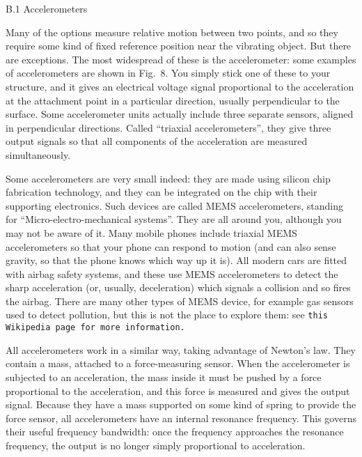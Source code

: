   B.1 Accelerometers 

  Many of the options measure relative motion between two points, and so they 
  require some kind of fixed reference position near the vibrating object. But 
  there are exceptions. The most widespread of these is the accelerometer: some 
  examples of accelerometers are shown in Fig.\ 8. You simply stick one of 
  these to your structure, and it gives an electrical voltage signal 
  proportional to the acceleration at the attachment point in a particular 
  direction, usually perpendicular to the surface. Some accelerometer units 
  actually include three separate sensors, aligned in perpendicular directions. 
  Called “triaxial accelerometers”, they give three output signals so that all 
  components of the acceleration are measured simultaneously. 

  Some accelerometers are very small indeed: they are made using silicon chip 
  fabrication technology, and they can be integrated on the chip with their 
  supporting electronics. Such devices are called MEMS accelerometers, standing 
  for “Micro-electro-mechanical systems”. They are all around you, although you 
  may not be aware of it. Many mobile phones include triaxial MEMS 
  accelerometers so that your phone can respond to motion (and can also sense 
  gravity, so that the phone knows which way up it is). All modern cars are 
  fitted with airbag safety systems, and these use MEMS accelerometers to 
  detect the sharp acceleration (or, usually, deceleration) which signals a 
  collision and so fires the airbag. There are many other types of MEMS device, 
  for example gas sensors used to detect pollution, but this is not the place 
  to explore them: see \tt{}this Wikipedia page\rm{} for more information. 

  All accelerometers work in a similar way, taking advantage of Newton’s law. 
  They contain a mass, attached to a force-measuring sensor. When the 
  accelerometer is subjected to an acceleration, the mass inside it must be 
  pushed by a force proportional to the acceleration, and this force is 
  measured and gives the output signal. Because they have a mass supported on 
  some kind of spring to provide the force sensor, all accelerometers have an 
  internal resonance frequency. This governs their useful frequency bandwidth: 
  once the frequency approaches the resonance frequency, the output is no 
  longer simply proportional to acceleration. 

